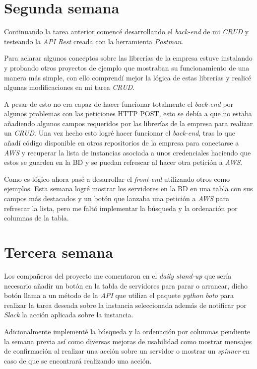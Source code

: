 \section{Segunda semana}

Continuando la tarea anterior comencé desarrollando el \textit{back-end} de mi \textit{CRUD} y testeando la \textit{API Rest} creada con la herramienta \textit{Postman}.

Para aclarar algunos conceptos sobre las librerías de la empresa estuve instalando y probando otros proyectos de ejemplo que mostraban su funcionamiento de una manera más simple, con ello comprendí mejor la lógica de estas librerías y realicé algunas modificaciones en mi tarea \textit{CRUD}. 

A pesar de esto no era capaz de hacer funcionar totalmente el \textit{back-end} por algunos problemas con las peticiones HTTP POST, esto se debía a que no estaba añadiendo algunos campos requeridos por las librerías de la empresa para realizar un \textit{CRUD}. Una vez hecho esto logré hacer funcionar el \textit{back-end}, tras lo que añadí código disponible en otros repositorios de la empresa para conectarse a \textit{AWS} y recuperar la lista de instancias asociada a unos credenciales haciendo que estos se guarden en la BD y se puedan refrescar al hacer otra petición a \textit{AWS}.

Como es lógico ahora pasé a desarrollar el \textit{front-end} utilizando otros como ejemplos. Esta semana logré mostrar los servidores en la BD en una tabla con sus campos más destacados y un botón que lanzaba una petición a \textit{AWS} para refrescar la lista, pero me faltó implementar la búsqueda y la ordenación por columnas de la tabla.
 
\section{Tercera semana}

Los compañeros del proyecto me comentaron en el \textit{daily stand-up} que sería necesario añadir un botón en la tabla de servidores para parar o arrancar, dicho botón llama a un método de la \textit{API} que utiliza el paquete \textit{python boto} para realizar la tarea deseada sobre la instancia seleccionada además de notificar por \textit{Slack} la acción aplicada sobre la instancia.

Adicionalmente implementé la búsqueda y la ordenación por columnas pendiente la semana previa así como diversas mejoras de usabilidad como mostrar mensajes de confirmación al realizar una acción sobre un servidor o mostrar un \textit{spinner} en caso de que se encontrará realizando una acción.

